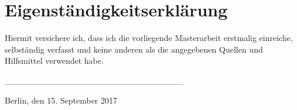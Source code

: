 \section*{Eigenständigkeitserklärung}
\vspace{2cm}
Hiermit versichere ich, dass ich die vorliegende Masterarbeit erstmalig einreiche, selbständig verfasst und keine anderen als die angegebenen Quellen und Hilfsmittel verwendet habe.
\vspace{4cm}
\begin{flushright}
	\_\_\_\_\_\_\_\_\_\_\_\_\_\_\_\_\_\_\_\_\_\_\_\_\_\_\_\_\_
\end{flushright}
Berlin, den 15. September 2017
